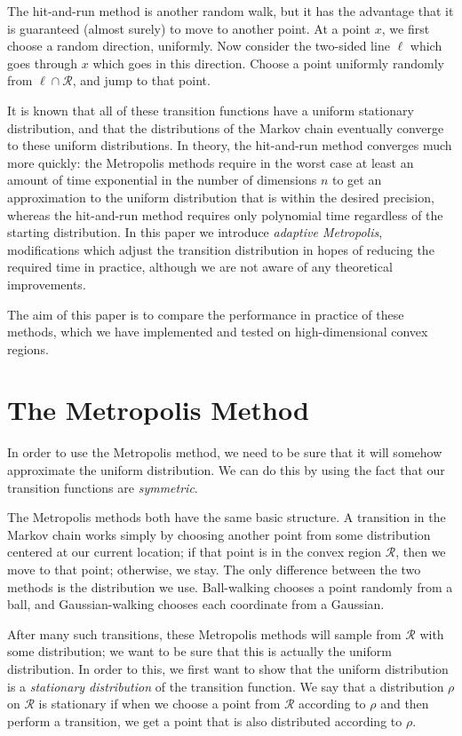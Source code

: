 \documentclass[11pt]{article}
\begin{document}
The hit-and-run method is another random walk, but it has the advantage that it is guaranteed (almost surely) to move to another point. At a point $x$, we first choose a random direction, uniformly. Now consider the two-sided line $\ell$ which goes through $x$ which goes in this direction. Choose a point uniformly randomly from $\ell\cap\mathcal{R}$, and jump to that point.

It is known that all of these transition functions have a uniform stationary distribution, and that the distributions of the Markov chain eventually converge to these uniform distributions. In theory, the hit-and-run method converges much more quickly: the Metropolis methods require in the worst case at least an amount of time exponential in the number of dimensions $n$ to get an approximation to the uniform distribution that is within the desired precision, whereas the hit-and-run method requires only polynomial time regardless of the starting distribution. In this paper we introduce \emph{adaptive Metropolis}, modifications which adjust the transition distribution in hopes of reducing the required time in practice, although we are not aware of any theoretical improvements.

The aim of this paper is to compare the performance in practice of these methods, which we have implemented and tested on high-dimensional convex regions.

\section{The Metropolis Method}

In order to use the Metropolis method, we need to be sure that it will somehow approximate the uniform distribution. We can do this by using the fact that our transition functions are \emph{symmetric}.

The Metropolis methods both have the same basic structure. A transition in the Markov chain works simply by choosing another point from some distribution centered at our current location; if that point is in the convex region $\mathcal{R}$, then we move to that point; otherwise, we stay. The only difference between the two methods is the distribution we use. Ball-walking chooses a point randomly from a ball, and Gaussian-walking chooses each coordinate from a Gaussian.

After many such transitions, these Metropolis methods will sample from $\mathcal{R}$ with some distribution; we want to be sure that this is actually the uniform distribution. In order to this, we first want to show that the uniform distribution is a \emph{stationary distribution} of the transition function. We say that a distribution $\rho$ on $\mathcal{R}$ is stationary if when we choose a point from $\mathcal{R}$ according to $\rho$ and then perform a transition, we get a point that is also distributed according to $\rho$.
\end{document}
